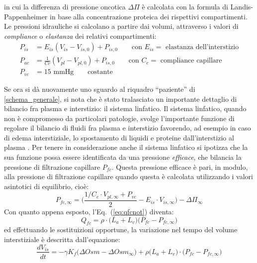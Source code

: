in cui la differenza di pressione oncotica $\Delta \Pi$ è calcolata con la formula di Landis-Pappenheimer in base alla concentrazione proteica dei rispettivi compartimenti. Le pressioni idrauliche si calcolano a partire dai volumi, attraverso i valori di \textit{compliance} o \textit{elastanza} dei relativi compartimenti:
\begin{align}
  P_{is} &= E_{is} (V_{is}-V_{is,0}) + P_{is,0} \qquad \text{con $E_{is}=$ elastanza dell'interstizio}\\
	P_{ac} &= \frac{1}{Cc} (V_{pl}-V_{pl,0}) + P_{is,0} \qquad \text{con $C_c=$ compliance capillare} \\
	P_{vc} &= 15\text{ mmHg} \qquad \text{costante}
\end{align}

Se ora si dà nuovamente uno sguardo al riquadro ``paziente'' di \figurename\ref{schema_generale}, si nota che è stato tralasciato un importante dettaglio di bilancio fra plasma e interstizio: il sistema linfatico. Il sistema linfatico, quando non è compromesso da particolari patologie, svolge l'importante funzione di regolare il bilancio di fluidi fra plasma e interstizio favorendo, ad esempio in caso di edema interstiziale, lo spostamento di liquidi e proteine dall'interstizio al plasma \cite{guyton}. Per tenere in considerazione anche il sistema linfatico si ipotizza che la sua funzione possa essere identificata da una pressione \textit{efficace}, che bilancia la pressione di filtrazione capillare $P_{fc}$. Questa pressione efficace è pari, in modulo, alla pressione di filtrazione capillare quando questa è calcolata utilizzando i valori asintotici di equilibrio, cioè:
\begin{equation}
	P_{fc,\infty} = \biggl(\frac{1/C_c\cdot V_{pl,\infty} + P_{vc}}{2} - E_{is}\cdot V_{is,\infty}\biggr) - \Delta \Pi_{\infty}
\end{equation}
Con quanto appena esposto, l'Eq.~(\ref{eq:qfcnot}) diventa:
\begin{equation}\label{eq:qfcyes}
	Q_{fc} =  \rho\cdot\bigl(L_a+L_v\bigr) \bigl(P_{fc}-P_{fc,\infty}\bigr)
\end{equation}
ed effettuando le sostituizioni opportune, la variazione nel tempo del volume interstiziale è descritta dall'equazione:
\begin{equation}\label{eq:dVis}
	\frac{dV_{is}}{dt} = - \gamma K_f \bigl(\Delta Osm - \Delta Osm_{\infty}\bigr) + \rho \bigl(L_a+L_v\bigr)\cdot \bigl(P_{fc}-P_{fc,\infty}\bigr)
\end{equation}


